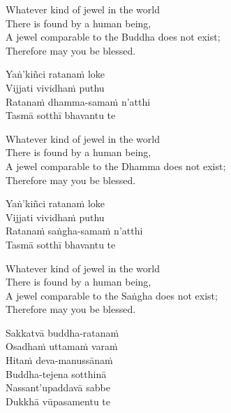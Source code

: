 \begin{english-verses}
  Whatever kind of jewel in the world\\
  There is found by a human being,\\
  A jewel comparable to the Buddha does not exist;\\
  Therefore may you be blessed.
\end{english-verses}

\begin{pali-hang-continued}
  Yaṅ'kiñci ratanaṁ loke\\
  Vijjati vividhaṁ puthu\\
  Ratanaṁ dhamma-samaṁ n'atthi\\
  Tasmā sotthī bhavantu te
\end{pali-hang-continued}

\begin{english-verses}
  Whatever kind of jewel in the world\\
  There is found by a human being,\\
  A jewel comparable to the Dhamma does not exist;\\
  Therefore may you be blessed.
\end{english-verses}

\begin{pali-hang-continued}
  Yaṅ'kiñci ratanaṁ loke\\
  Vijjati vividhaṁ puthu\\
  Ratanaṁ saṅgha-samaṁ n'atthi\\
  Tasmā sotthī bhavantu te
\end{pali-hang-continued}

\begin{english-verses}
  Whatever kind of jewel in the world\\
  There is found by a human being,\\
  A jewel comparable to the Saṅgha does not exist;\\
  Therefore may you be blessed.
\end{english-verses}

\begin{pali-hang-continued}
  Sakkatvā buddha-ratanaṁ\\
  Osadhaṁ\makeatletter\hyperlink{endnote127-appendix}\makeatother
  uttamaṁ varaṁ\\
  Hitaṁ deva-manussānaṁ\\
  Buddha-tejena sotthinā\\
  Nassant'upaddavā sabbe\\
  Dukkhā vūpasamentu te
\end{pali-hang-continued}

